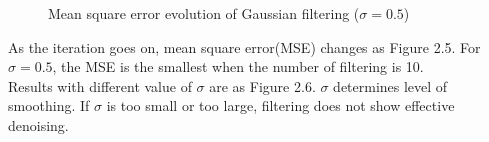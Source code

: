 \documentclass[paper=a4, fontsize=11pt]{scrartcl} %
\numberwithin{equation}{section} %
\numberwithin{figure}{section} %
\numberwithin{table}{section} %
\begin{document}
\begin{figure}[H]
	\centering
	\noindent{}
\caption{Mean square error evolution of Gaussian filtering ($\sigma = 0.5$)}
\end{figure}

As the iteration goes on, mean square error(MSE) changes as Figure 2.5. For $\sigma = 0.5$, the MSE is the smallest when the number of filtering is 10. \\ 

Results with different value of $\sigma$ are as Figure 2.6. $\sigma$ determines level of smoothing. If $\sigma$ is too small or too large, filtering does not show effective denoising.
\end{document}
